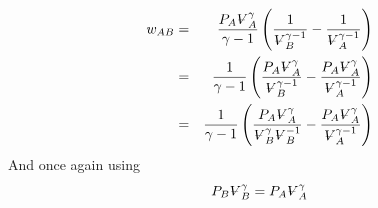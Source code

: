 \documentclass{article}
\begin{document}
\begin{eqnarray*}
w_{AB} &=&\frac{P_{A}%
\ooalign{\hfil$V$\hfil\cr\kern0.1em--\hfil\cr}%
_{A}^{\gamma }}{\gamma -1}\left( \frac{1}{%
\ooalign{\hfil$V$\hfil\cr\kern0.1em--\hfil\cr}%
_{B}^{\gamma -1}}-\frac{1}{%
\ooalign{\hfil$V$\hfil\cr\kern0.1em--\hfil\cr}%
_{A}^{\gamma -1}}\right) \\
&=&\frac{1}{\gamma -1}\left( \frac{P_{A}%
\ooalign{\hfil$V$\hfil\cr\kern0.1em--\hfil\cr}%
_{A}^{\gamma }}{%
\ooalign{\hfil$V$\hfil\cr\kern0.1em--\hfil\cr}%
_{B}^{\gamma -1}}-\frac{P_{A}%
\ooalign{\hfil$V$\hfil\cr\kern0.1em--\hfil\cr}%
_{A}^{\gamma }}{%
\ooalign{\hfil$V$\hfil\cr\kern0.1em--\hfil\cr}%
_{A}^{\gamma -1}}\right) \\
&=&\frac{1}{\gamma -1}\left( \frac{P_{A}%
\ooalign{\hfil$V$\hfil\cr\kern0.1em--\hfil\cr}%
_{A}^{\gamma }}{%
\ooalign{\hfil$V$\hfil\cr\kern0.1em--\hfil\cr}%
_{B}^{\gamma }%
\ooalign{\hfil$V$\hfil\cr\kern0.1em--\hfil\cr}%
_{B}^{-1}}-\frac{P_{A}%
\ooalign{\hfil$V$\hfil\cr\kern0.1em--\hfil\cr}%
_{A}^{\gamma }}{%
\ooalign{\hfil$V$\hfil\cr\kern0.1em--\hfil\cr}%
_{A}^{\gamma -1}}\right)
\end{eqnarray*}%
And once again using 
\[
P_{B}%
\ooalign{\hfil$V$\hfil\cr\kern0.1em--\hfil\cr}%
_{B}^{\gamma }=P_{A}%
\ooalign{\hfil$V$\hfil\cr\kern0.1em--\hfil\cr}%
_{A}^{\gamma } 
\]%
\end{document}
